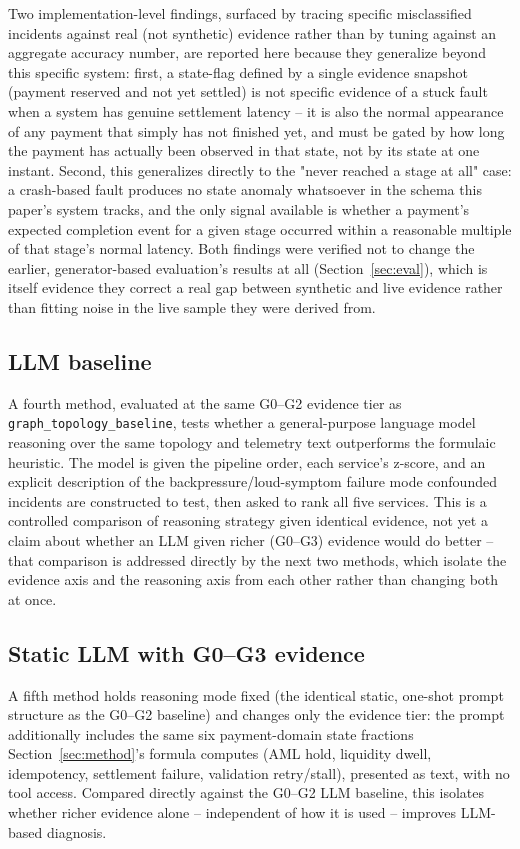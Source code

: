 \documentclass[conference]{IEEEtran}
\begin{document}
Two implementation-level findings, surfaced by tracing specific
misclassified incidents against real (not synthetic) evidence rather than
by tuning against an aggregate accuracy number, are reported here because
they generalize beyond this specific system: first, a state-flag defined
by a single evidence snapshot (payment reserved and not yet settled) is not
specific evidence of a stuck fault when a system has genuine settlement
latency -- it is also the normal appearance of any payment that simply has
not finished yet, and must be gated by how long the payment has actually
been observed in that state, not by its state at one instant. Second, this
generalizes directly to the "never reached a stage at all" case: a crash-based
fault produces no state anomaly whatsoever in the schema this paper's
system tracks, and the only signal available is whether a payment's
expected completion event for a given stage occurred within a reasonable
multiple of that stage's normal latency. Both findings were verified not to
change the earlier, generator-based evaluation's results at all (Section~\ref{sec:eval}),
which is itself evidence they correct a real gap between synthetic and live
evidence rather than fitting noise in the live sample they were derived
from.

\subsection{LLM baseline}
A fourth method, evaluated at the same G0--G2 evidence tier as
\texttt{graph\_topology\_baseline}, tests whether a general-purpose language
model reasoning over the same topology and telemetry text outperforms the
formulaic heuristic. The model is given the pipeline order, each service's
z-score, and an explicit description of the backpressure/loud-symptom
failure mode confounded incidents are constructed to test, then asked to
rank all five services. This is a controlled comparison of reasoning
strategy given identical evidence, not yet a claim about whether an LLM
given richer (G0--G3) evidence would do better -- that comparison is
addressed directly by the next two methods, which isolate the evidence
axis and the reasoning axis from each other rather than changing both at
once.

\subsection{Static LLM with G0--G3 evidence}
A fifth method holds reasoning mode fixed (the identical static, one-shot
prompt structure as the G0--G2 baseline) and changes only the evidence
tier: the prompt additionally includes the same six payment-domain state
fractions Section~\ref{sec:method}'s formula computes (AML hold, liquidity
dwell, idempotency, settlement failure, validation retry/stall), presented
as text, with no tool access. Compared directly against the G0--G2 LLM
baseline, this isolates whether richer evidence alone -- independent of
how it is used -- improves LLM-based diagnosis.
\end{document}
